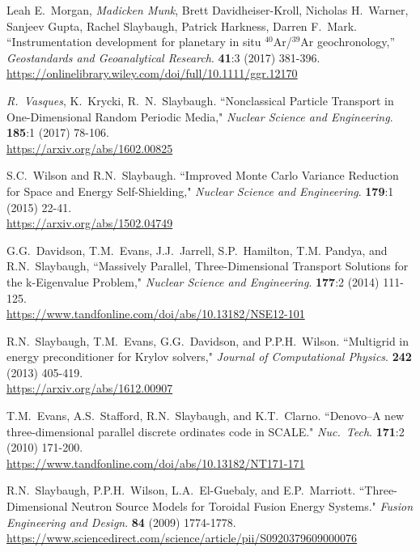 \begin{bibsection}
\item Leah E.\ Morgan, \textit{Madicken Munk}, Brett Davidheiser-Kroll, Nicholas H.\ Warner, Sanjeev Gupta, Rachel Slaybaugh, Patrick Harkness, Darren F.\ Mark. ``Instrumentation development for planetary in situ $^{40}$Ar/$^{39}$Ar geochronology,'' \textit{Geostandards and Geoanalytical Research}. \textbf{41}:3 (2017) 381-396.\\
\url{https://onlinelibrary.wiley.com/doi/full/10.1111/ggr.12170}

\item \textit{R.\ Vasques}, K.\ Krycki, R.\ N.\ Slaybaugh. ``Nonclassical Particle Transport in One-Dimensional Random Periodic Media," \textit{Nuclear Science and Engineering}.  \textbf{185}:1 (2017) 78-106.\\
\url{https://arxiv.org/abs/1602.00825}

\item S.C.\ Wilson and R.N.\ Slaybaugh. ``Improved Monte Carlo Variance Reduction for Space and Energy Self-Shielding," \textit{Nuclear Science and Engineering}. \textbf{179}:1 (2015) 22-41.\\
\url{https://arxiv.org/abs/1502.04749}

\item G.G.\ Davidson, T.M.\ Evans, J.J.\ Jarrell, S.P.\ Hamilton, T.M. Pandya, and R.N.\ Slaybaugh, ``Massively Parallel, Three-Dimensional Transport Solutions for the k-Eigenvalue Problem," \textit{Nuclear Science and Engineering}. \textbf{177}:2 (2014) 111-125.\\
\url{https://www.tandfonline.com/doi/abs/10.13182/NSE12-101}

\item R.N.\ Slaybaugh, T.M.\ Evans, G.G.\ Davidson, and P.P.H.\ Wilson. ``Multigrid in energy preconditioner for Krylov solvers," \textit{Journal of Computational Physics}. \textbf{242} (2013) 405-419.\\
\url{https://arxiv.org/abs/1612.00907}

\item T.M.\ Evans, A.S.\ Stafford, R.N.\ Slaybaugh, and K.T.\ Clarno. ``Denovo--A new three-dimensional parallel discrete ordinates code in SCALE." \textit{Nuc.\ Tech}. \textbf{171}:2 (2010) 171-200.\\
\url{https://www.tandfonline.com/doi/abs/10.13182/NT171-171}

\item R.N.\ Slaybaugh, P.P.H.\ Wilson, L.A.\ El-Guebaly, and E.P.\ Marriott. ``Three-Dimensional Neutron Source Models for Toroidal Fusion Energy Systems." \textit{Fusion Engineering and Design}. \textbf{84} (2009) 1774-1778.\\
\url{https://www.sciencedirect.com/science/article/pii/S0920379609000076} 


\end{bibsection}
